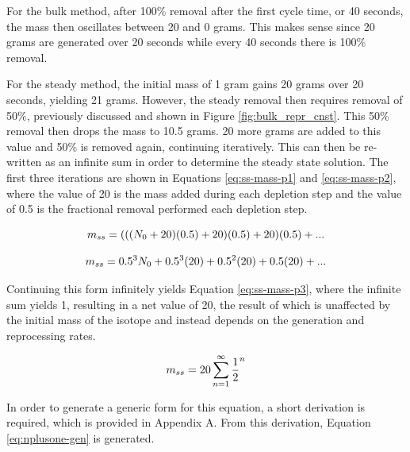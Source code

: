 For the bulk method, after 100\% removal after the first cycle time, or 40 seconds, the mass then oscillates between 20 and 0 grams. This makes sense since 20 grams are generated over 20 seconds while every 40 seconds there is 100\% removal.

For the steady method, the initial mass of 1 gram gains 20 grams over 20 seconds, yielding 21 grams. However, the steady removal then requires removal of 50\%, previously discussed and shown in Figure \ref{fig:bulk_repr_cnst}. This 50\% removal then drops the mass to 10.5 grams. 20 more grams are added to this value and 50\% is removed again, continuing iteratively. This can then be re-written as an infinite sum in order to determine the steady state solution. The first three iterations are shown in Equations \eqref{eq:ss-mass-p1} and \eqref{eq:ss-mass-p2}, where the value of 20 is the mass added during each depletion step and the value of 0.5 is the fractional removal performed each depletion step.


\begin{equation} \hfill
m_{ss} = (((N_0+20)(0.5)+20)(0.5)+20)(0.5) + ...
\hfill\label{eq:ss-mass-p1} \end{equation}

\begin{equation} \hfill
m_{ss} = 0.5^3 N_0 + 0.5^3 (20) + 0.5^2 (20) + 0.5 (20) + ...
\hfill\label{eq:ss-mass-p2} \end{equation}

Continuing this form infinitely yields Equation \eqref{eq:ss-mass-p3}, where the infinite sum yields 1, resulting in a net value of 20, the result of which is unaffected by the initial mass of the isotope and instead depends on the generation and reprocessing rates.

\begin{equation} \hfill
m_{ss} = 20 \sum_{n=1}^\infty \frac{1}{2}^n
\hfill\label{eq:ss-mass-p3} \end{equation}

In order to generate a generic form for this equation, a short derivation is required, which is provided in Appendix A. From this derivation, Equation \eqref{eq:nplusone-gen} is generated.

